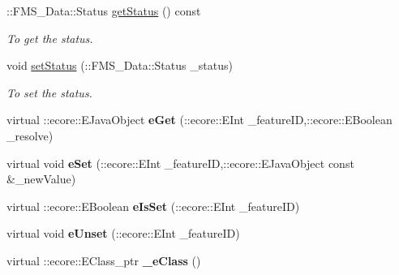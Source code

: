 \begin{DoxyCompactItemize}
::FMS\_\-Data::Status \hyperlink{classFMS__Data_1_1LsTransferOptions_a3f3a8cb7a7d45473aa13767ee5f239a0}{getStatus} () const 
\begin{DoxyCompactList}\small\item\em To get the status. \item\end{DoxyCompactList}\item 
void \hyperlink{classFMS__Data_1_1LsTransferOptions_a20daa0db2a4c680c61326133d3f018f3}{setStatus} (::FMS\_\-Data::Status \_\-status)
\begin{DoxyCompactList}\small\item\em To set the status. \item\end{DoxyCompactList}\item 
\hypertarget{classFMS__Data_1_1LsTransferOptions_a16d4cfa26ad54106137119b5b7aef48b}{
virtual ::ecore::EJavaObject {\bfseries eGet} (::ecore::EInt \_\-featureID,::ecore::EBoolean \_\-resolve)}
\label{classFMS__Data_1_1LsTransferOptions_a16d4cfa26ad54106137119b5b7aef48b}

\item 
\hypertarget{classFMS__Data_1_1LsTransferOptions_adeddf6b14de169a406199e11b984f478}{
virtual void {\bfseries eSet} (::ecore::EInt \_\-featureID,::ecore::EJavaObject const \&\_\-newValue)}
\label{classFMS__Data_1_1LsTransferOptions_adeddf6b14de169a406199e11b984f478}

\item 
\hypertarget{classFMS__Data_1_1LsTransferOptions_afad1cd2481f5d36441ba22b772048c3f}{
virtual ::ecore::EBoolean {\bfseries eIsSet} (::ecore::EInt \_\-featureID)}
\label{classFMS__Data_1_1LsTransferOptions_afad1cd2481f5d36441ba22b772048c3f}

\item 
\hypertarget{classFMS__Data_1_1LsTransferOptions_a21f32645b6e9e5446715ed327918d893}{
virtual void {\bfseries eUnset} (::ecore::EInt \_\-featureID)}
\label{classFMS__Data_1_1LsTransferOptions_a21f32645b6e9e5446715ed327918d893}

\item 
\hypertarget{classFMS__Data_1_1LsTransferOptions_a684f1d8f8d771e94052971fcbde7a08c}{
virtual ::ecore::EClass\_\-ptr {\bfseries \_\-eClass} ()}
\label{classFMS__Data_1_1LsTransferOptions_a684f1d8f8d771e94052971fcbde7a08c}

\end{DoxyCompactItemize}
